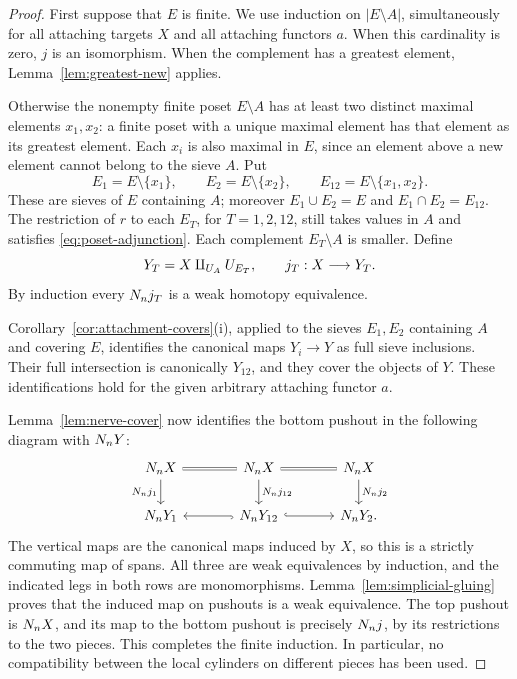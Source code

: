 \begin{proof}
First suppose that $E$ is finite.  We use induction on
$|E\setminus A|$, simultaneously for all attaching targets $X$ and
all attaching functors $a$.  When this cardinality is zero, $j$ is an
isomorphism.  When the complement has a greatest element,
Lemma~\ref{lem:greatest-new} applies.

Otherwise the nonempty finite poset $E\setminus A$ has at least two
distinct maximal elements $x_1,x_2$: a finite poset with a unique
maximal element has that element as its greatest element.  Each $x_i$
is also maximal in $E$, since an element above a new element cannot
belong to the sieve $A$.  Put
\[
 E_1=E\setminus\{x_1\},\qquad
 E_2=E\setminus\{x_2\},\qquad
 E_{12}=E\setminus\{x_1,x_2\}.
\]
These are sieves of $E$ containing $A$; moreover
$E_1\cup E_2=E$ and $E_1\cap E_2=E_{12}$.  The restriction of $r$ to
each $E_T$, for $T=1,2,12$, still takes values in $A$ and satisfies
\eqref{eq:poset-adjunction}.  Each complement $E_T\setminus A$ is
smaller.  Define
\[
 Y_T=X\amalg_{U_{A}}U_{E_T},\qquad j_T:X\longrightarrow Y_T.
\]
By induction every $N_n j_T$ is a weak homotopy equivalence.

Corollary~\ref{cor:attachment-covers}(i), applied to the sieves
$E_1,E_2$ containing $A$ and covering $E$, identifies the canonical
maps $Y_i\to Y$ as full sieve inclusions. Their full intersection is
canonically $Y_{12}$, and they cover the objects of $Y$. These
identifications hold for the given arbitrary attaching functor $a$.

Lemma~\ref{lem:nerve-cover} now identifies the bottom pushout in the
following diagram with $N_n Y$:
\begin{equation}\label{eq:couniversal-cover-spans}
\begin{tikzcd}[column sep=large]
 \Street X \arrow[d,"\Street j_1"'] &
 \Street X \arrow[l,equal] \arrow[r,equal]
             \arrow[d,"\Street j_{12}"] &
 \Street X \arrow[d,"\Street j_2"] \\
 \Street Y_1 &
 \Street Y_{12} \arrow[l,hook] \arrow[r,hook] &
 \Street Y_2 .
\end{tikzcd}
\end{equation}
The vertical maps are the canonical maps induced by $X$, so this is
a strictly commuting map of spans.  All three are weak equivalences
by induction, and the indicated legs in both rows are
monomorphisms.  Lemma~\ref{lem:simplicial-gluing} proves that the
induced map on pushouts is a weak equivalence.  The top pushout is
$N_n X$, and its map to the bottom pushout is precisely
$N_n j$, by its restrictions to the two pieces.  This completes
the finite induction.  In particular, no compatibility between the
local cylinders on different pieces has been used.


\end{proof}

